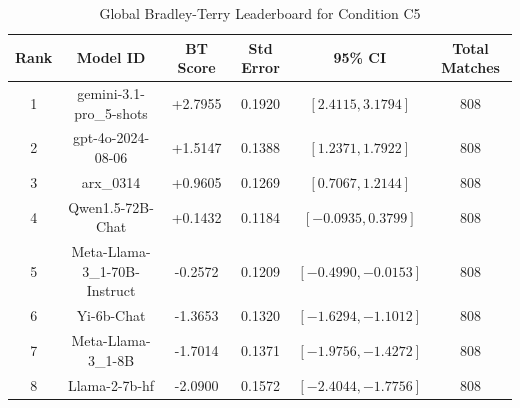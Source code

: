 \begin{table}[ht]
\centering
\caption{Global Bradley-Terry Leaderboard for Condition \textsc{C5}}
\label{tab:leaderboard_c5}
\begin{tabular}{cccccc}
\hline
\textbf{Rank} & \textbf{Model ID} & \textbf{BT Score} & \textbf{Std Error} & \textbf{95\% CI} & \textbf{Total Matches} \\
\hline
1 & gemini-3.1-pro\_5-shots & +2.7955 & 0.1920 & $[2.4115, 3.1794]$ & 808 \\
2 & gpt-4o-2024-08-06 & +1.5147 & 0.1388 & $[1.2371, 1.7922]$ & 808 \\
3 & arx\_0314 & +0.9605 & 0.1269 & $[0.7067, 1.2144]$ & 808 \\
4 & Qwen1.5-72B-Chat & +0.1432 & 0.1184 & $[-0.0935, 0.3799]$ & 808 \\
5 & Meta-Llama-3\_1-70B-Instruct & -0.2572 & 0.1209 & $[-0.4990, -0.0153]$ & 808 \\
6 & Yi-6b-Chat & -1.3653 & 0.1320 & $[-1.6294, -1.1012]$ & 808 \\
7 & Meta-Llama-3\_1-8B & -1.7014 & 0.1371 & $[-1.9756, -1.4272]$ & 808 \\
8 & Llama-2-7b-hf & -2.0900 & 0.1572 & $[-2.4044, -1.7756]$ & 808 \\
\hline
\end{tabular}
\end{table}

